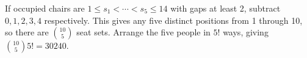 If occupied chairs are $1\le s_1<\cdots<s_5\le 14$ with gaps at least 2, subtract $0,1,2,3,4$ respectively. This gives any five distinct positions from 1 through 10, so there are $\binom{10}{5}$ seat sets. Arrange the five people in $5!$ ways, giving $\binom{10}{5}5!=\boxed{30240}$.
